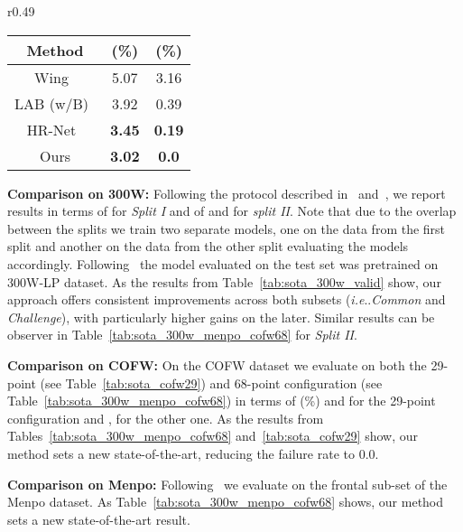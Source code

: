 \documentclass{bmvc2k}
\makeatletter
\DeclareRobustCommand\onedot{\futurelet\@let@token\@onedot}
\def\@onedot{\ifx\@let@token.\else.\null\fi\xspace}
\def\ie{\emph{i.e}\onedot} \def\Ie{\emph{I.e}\onedot}
\newcommand{\best}[1]{\color{red}\textbf{#1}}
\newcommand{\secondb}[1]{\color{blue}\textbf{#1}}
\makeatother
\begin{document}
\begin{wraptable}[10]{r}{0.49\textwidth}
\vspace{-0.3cm}
\centering
		\begin{tabular}{ccc}
			\toprule
			Method & (\%) &   (\%) \\
			\midrule
            Wing~\cite{feng2018wing} & 5.07 & 3.16 \\
            LAB  (w/B)~\cite{wu2018look} & 3.92 & 0.39 \\
            HR-Net~\cite{sun2019high} & \secondb{3.45} & \secondb{0.19} \\
            Ours & \best{3.02} & \best{0.0} \\ 
			\bottomrule
		\end{tabular}
			\caption{Comparison on COFW-29. Results for other methods taken from~\cite{sun2019high}.}\label{tab:sota_cofw29}
\end{wraptable}


\noindent \textbf{Comparison on 300W:} Following the protocol described in~\cite{sagonas2013300} and~\cite{bulat2017far}, we report results in terms of  for \textit{Split I} and of  and  for \textit{split II}. Note that due to the overlap between the splits we train two separate models, one on the data from the first split and another on the data from the other split evaluating the models accordingly. Following~\cite{bulat2017far,kumar2020luvli} the model evaluated on the test set was pretrained on 300W-LP dataset. As the results from Table~\ref{tab:sota_300w_valid} show, our approach offers consistent improvements across both subsets (\ie \textit{Common} and \textit{Challenge}), with particularly higher gains on the later. Similar results can be observer in Table~\ref{tab:sota_300w_menpo_cofw68} for \textit{Split II}.

\noindent \textbf{Comparison on COFW:} On the COFW dataset we evaluate on both the 29-point (see Table~\ref{tab:sota_cofw29}) and 68-point configuration (see Table~\ref{tab:sota_300w_menpo_cofw68}) in terms of (\%) and  for the 29-point configuration and ,  for the other one. As the results from Tables~\ref{tab:sota_300w_menpo_cofw68} and~\ref{tab:sota_cofw29} show, our method sets a new state-of-the-art, reducing the failure rate to 0.0.

\noindent \textbf{Comparison on Menpo:} Following~\cite{kumar2020luvli} we evaluate on the frontal sub-set of the Menpo dataset. As Table~\ref{tab:sota_300w_menpo_cofw68} shows, our method sets a new state-of-the-art result.
\end{document}
